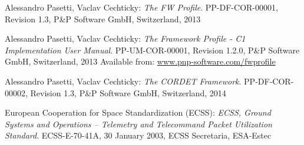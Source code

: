 \documentclass[a4paper,10pt]{article}
\begin{document}



\newpage

\begin{thebibliography}{6}
 
 Alessandro Pasetti, Vaclav Cechticky:
           {\sl The FW Profile}. PP-DF-COR-00001, Revision 1.3,
           P\&P Software GmbH, Switzerland, 2013 

 Alessandro Pasetti, Vaclav Cechticky:
           {\sl The Framework Profile - C1 Implementation User Manual}. 
           PP-UM-COR-00001, Revision 1.2.0,
           P\&P Software GmbH, Switzerland, 2013
		   Available from: \url{www.pnp-software.com/fwprofile}            
           
 Alessandro Pasetti, Vaclav Cechticky:
           {\sl The CORDET Framework}. 
           PP-DF-COR-00002, Revision 1.3,
           P\&P Software GmbH, Switzerland, 2014          
           
 European Cooperation for Space Standardization (ECSS):
           {\sl ECSS, Ground Systems and Operations – Telemetry and Telecommand Packet Utilization Standard}. 
           ECSS-E-70-41A, 30 January 2003,
           ECSS Secretaria, ESA-Estec              

\end{thebibliography}
\end{document}
